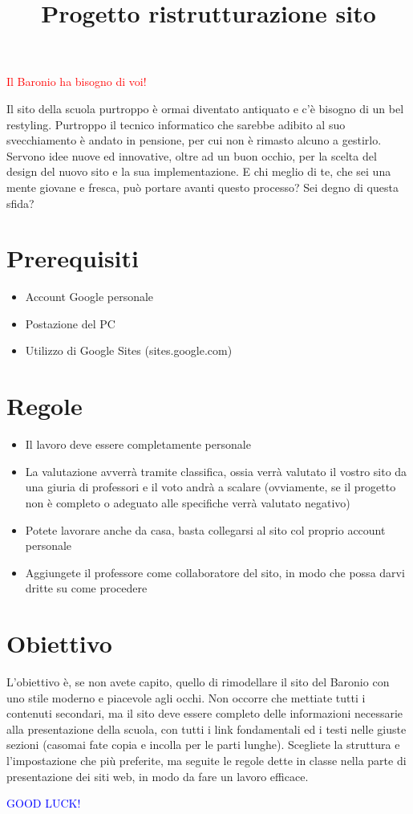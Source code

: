 \documentclass[12pt]{article}
\begin{document}
	\title{Progetto ristrutturazione sito}
	\maketitle
	
	\begin{center}
		\textcolor{red}{\huge{Il Baronio ha bisogno di voi!}}
	\end{center}
	Il sito della scuola purtroppo è ormai diventato antiquato e c'è bisogno di un bel restyling. Purtroppo il tecnico informatico che sarebbe adibito al suo svecchiamento è andato in pensione, per cui non è rimasto alcuno a gestirlo.\\
	Servono idee nuove ed innovative, oltre ad un buon occhio, per la scelta del design del nuovo sito e la sua implementazione. E chi meglio di te, che sei una mente giovane e fresca, può portare avanti questo processo? Sei degno di questa sfida?\\
	\section{Prerequisiti}
	\begin{itemize}
		\item Account Google personale
		\item Postazione del PC
		\item Utilizzo di Google Sites (sites.google.com)
	\end{itemize}
	\section{Regole}
	\begin{itemize}
		\item Il lavoro deve essere completamente personale
		\item La valutazione avverrà tramite classifica, ossia verrà valutato il vostro sito da una giuria di professori e il voto andrà a scalare (ovviamente, se il progetto non è completo o adeguato alle specifiche verrà valutato negativo)
		\item Potete lavorare anche da casa, basta collegarsi al sito col proprio account personale
		\item Aggiungete il professore come collaboratore del sito, in modo che possa darvi dritte su come procedere
	\end{itemize}
	\section{Obiettivo}
	L'obiettivo è, se non avete capito, quello di rimodellare il sito del Baronio con uno stile moderno e piacevole agli occhi. Non occorre che mettiate tutti i contenuti secondari, ma il sito deve essere completo delle informazioni necessarie alla presentazione della scuola, con tutti i link fondamentali ed i testi nelle giuste sezioni (casomai fate copia e incolla per le parti lunghe). Scegliete la struttura e l'impostazione che più preferite, ma seguite le regole dette in classe nella parte di presentazione dei siti web, in modo da fare un lavoro efficace.
	
	\begin{center}
		\textcolor{blue}{\huge{GOOD LUCK!}}
	\end{center}
	
\end{document}

